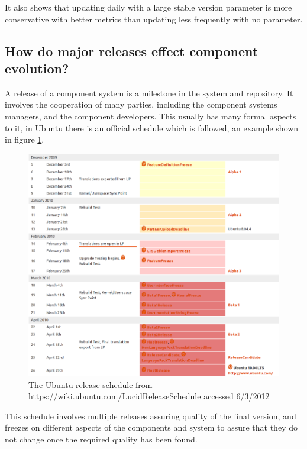 It also shows that updating daily with a large stable version parameter is more conservative with better metrics than updating less frequently with no parameter.

\subsection{How do major releases effect component evolution?}
A release of a component system is a milestone in the system and repository.
It involves the cooperation of many parties, including the component systems managers, and the component developers.
This usually has many formal aspects to it, in Ubuntu there is an official schedule which is followed, an example shown in figure \ref{ubuntuSchedule}.

\begin{figure}[htp]
\begin{center}
  \includegraphics[width=\textwidth]{ubuntusimulationpics/ubunturelease}
  \caption[labelInTOC]{The Ubuntu release schedule from https://wiki.ubuntu.com/LucidReleaseSchedule accessed 6/3/2012}
  \label{ubuntuSchedule}
\end{center}
\end{figure}

This schedule involves multiple releases assuring quality of the final version, 
and freezes on different aspects of the components and system to assure that they do not change once the required quality has been found.


